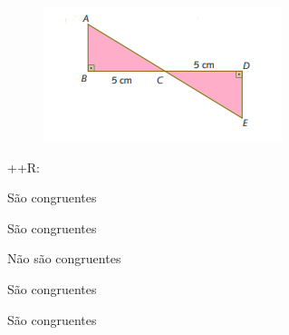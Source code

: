\item
\begin{figure}[H]
\centering\includegraphics[width=2.73958in,height=1.54167in]{./imgSAEB_8_MAT/media/image23.png}
\end{figure}

++R:
\item São congruentes
\item São congruentes
\item Não são congruentes
\item São congruentes
\item São congruentes

